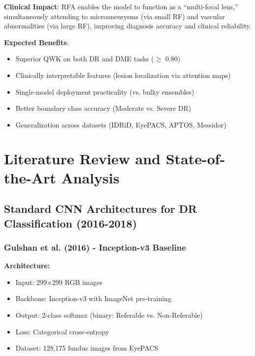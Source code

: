 \documentclass[12pt,a4paper]{article}
\begin{document}
\textbf{Clinical Impact}: RFA enables the model to function as a ``multi-focal lens,'' simultaneously attending to microaneurysms (via small RF) and vascular abnormalities (via large RF), improving diagnosis accuracy and clinical reliability.

\textbf{Expected Benefits}:
\begin{itemize}
    \item Superior QWK on both DR and DME tasks ($\geq$ 0.80)
    \item Clinically interpretable features (lesion localization via attention maps)
    \item Single-model deployment practicality (vs. bulky ensembles)
    \item Better boundary class accuracy (Moderate vs. Severe DR)
    \item Generalization across datasets (IDRiD, EyePACS, APTOS, Messidor)
\end{itemize}

\newpage

\section{Literature Review and State-of-the-Art Analysis}

\subsection{Standard CNN Architectures for DR Classification (2016-2018)}

\subsubsection{Gulshan et al. (2016) - Inception-v3 Baseline}

\textbf{Architecture:}
\begin{itemize}
    \item Input: 299×299 RGB images
    \item Backbone: Inception-v3 with ImageNet pre-training
    \item Output: 2-class softmax (binary: Referable vs. Non-Referable)
    \item Loss: Categorical cross-entropy
    \item Dataset: 128,175 fundus images from EyePACS
\end{itemize}
\end{document}
